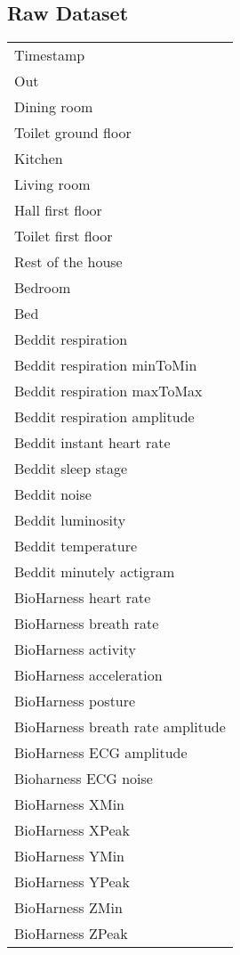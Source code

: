 \begin{appendices}
		\subsection{Raw Dataset}
			\begin{tabular}{l}
				Timestamp\\
				Out\\
				Dining room\\
				Toilet ground floor\\
				Kitchen\\
				Living room\\
				Hall first floor\\
				Toilet first floor\\
				Rest of the house\\
				Bedroom\\
				Bed\\
				Beddit respiration\\
				Beddit respiration minToMin\\
				Beddit respiration maxToMax\\
				Beddit respiration amplitude\\
				Beddit instant heart rate\\
				Beddit sleep stage\\
				Beddit noise\\
				Beddit luminosity\\
				Beddit temperature\\
				Beddit minutely actigram\\
				BioHarness heart rate\\
				BioHarness breath rate\\
				BioHarness activity\\
				BioHarness acceleration\\
				BioHarness posture\\
				BioHarness breath rate amplitude\\
				BioHarness ECG amplitude\\
				Bioharness ECG noise\\
				BioHarness XMin\\
				BioHarness XPeak\\
				BioHarness YMin\\
				BioHarness YPeak\\
				BioHarness ZMin\\
				BioHarness ZPeak\\
			\end{tabular}
			

\end{appendices}
